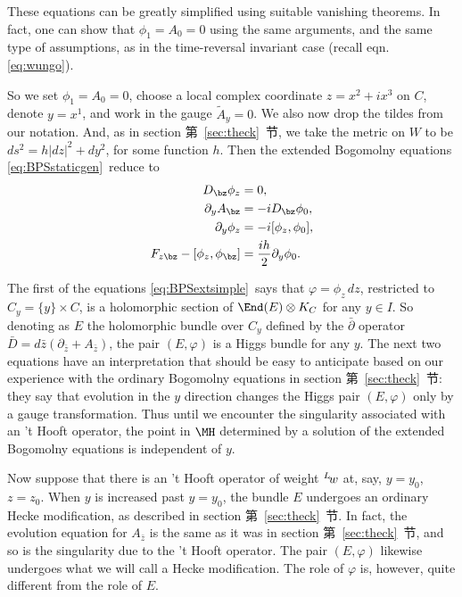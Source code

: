 These equations can be greatly simplified using suitable vanishing
theorems.  In fact, one can show that $\phi_1=A_0=0$ using the
same arguments, and the same type of assumptions, as in the
time-reversal invariant case (recall eqn. \eqref{eq:wungo}).

So we set $\phi_1=A_0=0$, choose a local complex coordinate
$z=x^2+ix^3$ on $C$, denote $y=x^1$,  and work in the gauge
$\tilde A_y=0$. We also now drop the tildes from our notation.
And, as in section 第~\ref{sec:theck}~节, we take the metric on $W$ to be $ds^2=h
|dz|^2+ dy^2$, for some function $h$. Then the extended Bogomolny
equations \eqref{eq:BPSstaticgen}\ reduce to
\setcounter{equation}{35}
\begin{equation}\label{eq:BPSextsimple}
\begin{aligned}D_\bz\phi_z&=0,\\
\partial_y A_\bz&=-i D_\bz \phi_0,\\
\partial_y\phi_z&=-i[\phi_z,\phi_0],\\
F_{z\bz}-[\phi_z,\phi_\bz]&={ih\over 2}\partial_y\phi_0.\end{aligned}
\end{equation}

The first of the equations \eqref{eq:BPSextsimple}\ says that
$\varphi=\phi_z\,dz$, restricted to $C_y=\{y\}\times C$, is a
holomorphic section of $\End(E)\otimes K_C$ for any $y\in I$. So
denoting as $E$ the holomorphic bundle over $C_y$ defined by the
$\bar\partial$ operator $\bar D=d\bar z(\partial_{\bar z}+A_{\bar
z})$, the pair $(E,\varphi)$ is a Higgs bundle for any $y$. The
next two equations have an interpretation that should be easy to
anticipate based on our experience with the ordinary Bogomolny
equations in section 第~\ref{sec:theck}~节: they say that evolution in the $y$
direction changes the Higgs pair $(E,\varphi)$ only by a gauge
transformation.  Thus until we encounter the singularity
associated with an 't Hooft operator, the point in $\MH$
determined by a solution of the extended Bogomolny equations is
independent of $y$.

Now suppose that there is an 't Hooft operator of weight
$^L\negthinspace w$ at, say, $y=y_0$, $z=z_0$.  When $y$ is
increased past $y=y_0$, the bundle $E$ undergoes an ordinary Hecke
modification, as described in section 第~\ref{sec:theck}~节.  In fact, the
evolution equation for $A_{\bar z}$ is the same as it was in
section 第~\ref{sec:theck}~节, and so is the singularity due to the 't Hooft
operator. The pair $(E,\varphi)$ likewise undergoes what we will
call a Hecke modification.  The role of $\varphi$ is, however,
quite different from the role of $E$.

